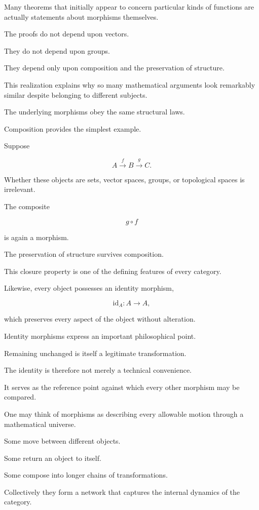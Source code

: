 \documentclass[11pt]{book}
\numberwithin{equation}{chapter}
\theoremstyle{definition}
\theoremstyle{plain}
\theoremstyle{remark}
\begin{document}
Many theorems that initially appear to concern particular kinds of functions are actually statements about morphisms themselves.

The proofs do not depend upon vectors.

They do not depend upon groups.

They depend only upon composition and the preservation of structure.

This realization explains why so many mathematical arguments look remarkably similar despite belonging to different subjects.

The underlying morphisms obey the same structural laws.

Composition provides the simplest example.

Suppose

\[
A
\xrightarrow{\,f\,}
B
\xrightarrow{\,g\,}
C.
\]

Whether these objects are sets, vector spaces, groups, or topological spaces is irrelevant.

The composite

\[
g\circ f
\]

is again a morphism.

The preservation of structure survives composition.

This closure property is one of the defining features of every category.

Likewise, every object possesses an identity morphism,

\[
\mathrm{id}_A:A\rightarrow A,
\]

which preserves every aspect of the object without alteration.

Identity morphisms express an important philosophical point.

Remaining unchanged is itself a legitimate transformation.

The identity is therefore not merely a technical convenience.

It serves as the reference point against which every other morphism may be compared.

One may think of morphisms as describing every allowable motion through a mathematical universe.

Some move between different objects.

Some return an object to itself.

Some compose into longer chains of transformations.

Collectively they form a network that captures the internal dynamics of the category.
\end{document}

